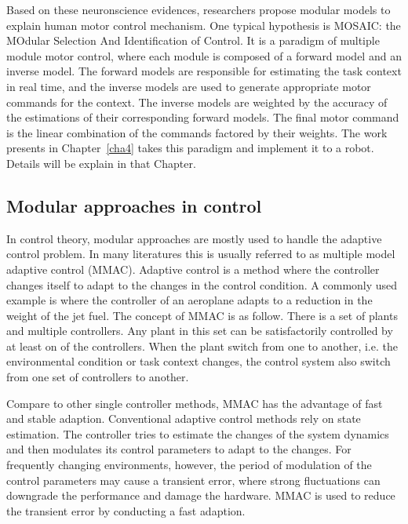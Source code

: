 Based on these neuronscience evidences, researchers propose modular models to explain human motor control mechanism. One typical hypothesis is MOSAIC: the MOdular Selection And Identification of Control. It is a paradigm of multiple module motor control, where each module is composed of a forward model and an inverse model. The forward models are responsible for estimating the task context in real time, and the inverse models are used to generate appropriate motor commands for the context. The inverse models are weighted by the accuracy of the estimations of their corresponding forward models. The final motor command is the linear combination of the commands factored by their weights. The work presents in Chapter~\ref{cha4} takes this paradigm and implement it to a robot. Details will be explain in that Chapter.



\subsection{Modular approaches in control}
\label{cha2:sec3:control}

In control theory, modular approaches are mostly used to handle the adaptive control problem. In many literatures this is usually referred to as multiple model adaptive control (MMAC). Adaptive control is a method where the controller changes itself to adapt to the changes in the control condition. A commonly used example is where the controller of an aeroplane adapts to a reduction in the weight of the jet fuel. The concept of MMAC is as follow. There is a set of plants and multiple controllers. Any plant in this set can be satisfactorily controlled by at least on of the controllers. When the plant switch from one to another, i.e. the environmental condition or task context changes, the control system also switch from one set of controllers to another.

Compare to other single controller methods, MMAC has the advantage of fast and stable adaption.
Conventional adaptive control methods rely on state estimation. The controller tries to estimate the changes of the system dynamics and then modulates its control parameters to adapt to the changes. For frequently changing environments, however, the period of modulation of the control parameters may cause a transient error, where strong fluctuations can downgrade the performance and damage the hardware. MMAC is used to reduce the transient error by conducting a fast adaption.

